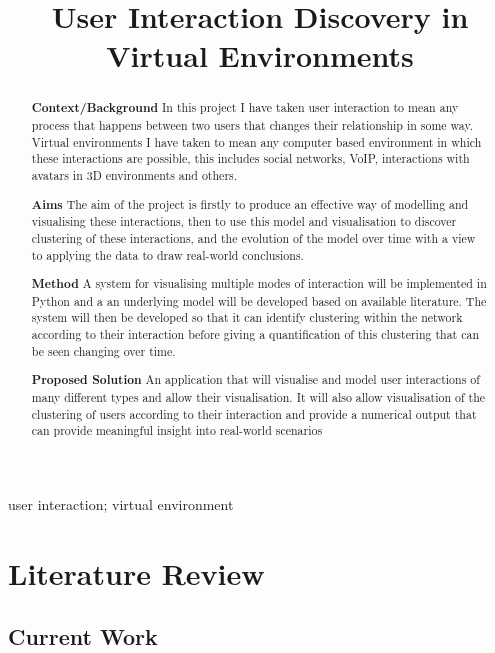 \documentclass[12pt,a4paper]{article}
\title{User Interaction Discovery in Virtual Environments}
\date{}
\begin{document}
\maketitle

\begin{abstract}

{\bf Context/Background}
In this project I have taken user interaction to mean any process that happens between two users that changes their relationship in some way. Virtual environments I have taken to mean any computer based environment in which these interactions are possible, this includes social networks, VoIP, interactions with avatars in 3D environments and others.

{\bf Aims}
The aim of the project is firstly to produce an effective way of modelling and visualising these interactions, then to use this model and visualisation to discover clustering of these interactions, and the evolution of the model over time with a view to applying the data to draw real-world conclusions.

{\bf Method}
A system for visualising multiple modes of interaction will be implemented in Python and a an underlying model will be developed based on available literature. The system will then be developed so that it can identify clustering within the network according to their interaction before giving a quantification of this clustering that can be seen changing over time.

{\bf Proposed Solution}
An application that will visualise and model user interactions of many different types and allow their visualisation. It will also allow visualisation of the clustering of users according to their interaction and provide a numerical output that can provide meaningful insight into real-world scenarios

\end{abstract}

\begin{keywords}
user interaction; virtual environment
\end{keywords}

\section{Literature Review}

\subsection{Current Work}
\end{document}
